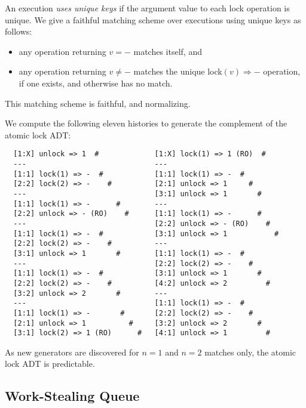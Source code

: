 An execution \emph{uses unique keys} if the argument value to each lock
operation is unique. We give a faithful matching scheme over executions using
unique keys as follows:
\begin{itemize}

  \item any operation returning $v = -$ matches itself, and

  \item any operation returning $v \neq -$ matches the unique
  lock$(v) \Rightarrow -$ operation, if one exists, and otherwise
  has no match.

\end{itemize}
This matching scheme is faithful, and normalizing.

We compute the following eleven histories to generate the complement of the
atomic lock ADT:
\begin{verbatim}
  [1:X] unlock => 1  #             [1:X] lock(1) => 1 (RO)  #
  ---                              ---
  [1:1] lock(1) => -  #            [1:1] lock(1) => -  #
  [2:2] lock(2) => -    #          [2:1] unlock => 1     #
  ---                              [3:1] unlock => 1       #
  [1:1] lock(1) => -      #        ---
  [2:2] unlock => - (RO)    #      [1:1] lock(1) => -      #
  ---                              [2:2] unlock => - (RO)    #
  [1:1] lock(1) => -  #            [3:1] unlock => 1           #
  [2:2] lock(2) => -    #          ---
  [3:1] unlock => 1       #        [1:1] lock(1) => -  #
  ---                              [2:2] lock(2) => -    #
  [1:1] lock(1) => -  #            [3:1] unlock => 1       #
  [2:2] lock(2) => -    #          [4:2] unlock => 2         #
  [3:2] unlock => 2       #        ---
  ---                              [1:1] lock(1) => -  #
  [1:1] lock(1) => -       #       [2:2] lock(2) => -    #
  [2:1] unlock => 1          #     [3:2] unlock => 2       #
  [3:1] lock(2) => 1 (RO)      #   [4:1] unlock => 1         #
\end{verbatim}
As new generators are discovered for $n=1$ and $n=2$ matches only, the atomic
lock ADT is predictable.

\subsection{Work-Stealing Queue}


